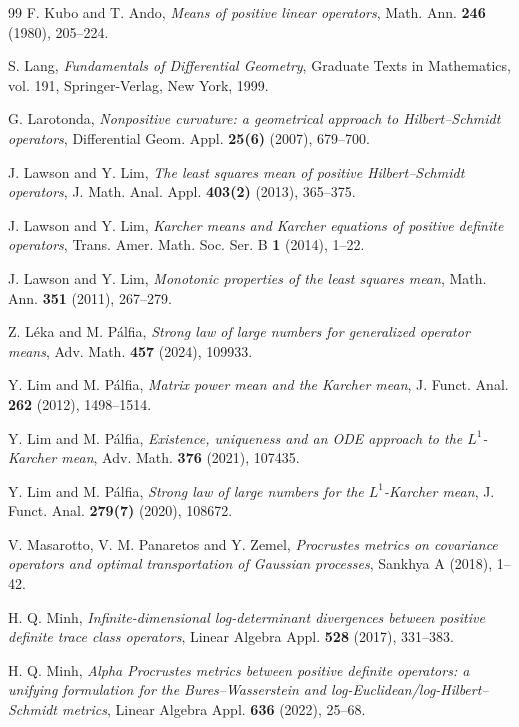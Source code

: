 \documentclass[12pt,reqno]{amsart}
\begin{document}
\begin{thebibliography}{99}
F. Kubo and T. Ando, \emph{Means of positive linear operators}, Math. Ann. \textbf{246} (1980), 205--224.

S. Lang, \emph{Fundamentals of Differential Geometry}, Graduate Texts in Mathematics, vol. 191, Springer-Verlag, New York, 1999.

G. Larotonda, \emph{Nonpositive curvature: a geometrical approach to Hilbert--Schmidt operators}, Differential Geom. Appl. \textbf{25(6)} (2007), 679--700.

J. Lawson and Y. Lim, \emph{The least squares mean of positive Hilbert--Schmidt operators}, J. Math. Anal. Appl. \textbf{403(2)} (2013), 365--375.

J. Lawson and Y. Lim, \emph{Karcher means and Karcher equations of positive definite operators}, Trans. Amer. Math. Soc. Ser. B \textbf{1} (2014), 1--22.


J. Lawson and Y. Lim, \emph{Monotonic properties of the least squares mean}, Math. Ann. \textbf{351} (2011), 267--279.

Z. L\'eka and M. P\'alfia, \emph{Strong law of large numbers for generalized operator means}, Adv. Math. \textbf{457} (2024), 109933.

Y. Lim and M. P\'alfia, \emph{Matrix power mean and the Karcher mean}, J. Funct. Anal. \textbf{262} (2012), 1498--1514.

Y. Lim and M. P\'alfia, \emph{Existence, uniqueness and an ODE approach to the $L^1$-Karcher mean}, Adv. Math. \textbf{376} (2021), 107435.

Y. Lim and M. P\'alfia, \emph{Strong law of large numbers for the $L^1$-Karcher mean}, J. Funct. Anal. \textbf{279(7)} (2020), 108672.

V. Masarotto, V. M. Panaretos and Y. Zemel, \emph{Procrustes metrics on covariance operators and optimal transportation of Gaussian processes}, Sankhya A (2018), 1--42.

H. Q. Minh, \emph{Infinite-dimensional log-determinant divergences between positive definite trace class operators}, Linear Algebra Appl. \textbf{528} (2017), 331--383.

H. Q. Minh, \emph{Alpha Procrustes metrics between positive definite operators: a unifying formulation for the Bures--Wasserstein and log-Euclidean/log-Hilbert--Schmidt metrics}, Linear Algebra Appl. \textbf{636} (2022), 25--68.


\end{thebibliography}
\end{document}
